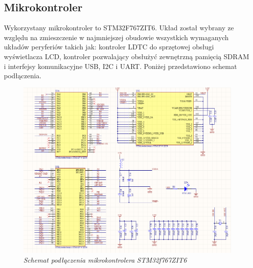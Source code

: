\documentclass[eng,printmode]{mgr}
\begin{document}
\subsection{Mikrokontroler}
Wykorzystany mikrokontroler to STM32F767ZIT6. Układ został wybrany ze względu na zmieszczenie w najmniejszej obudowie wszystkich wymaganych układów peryferiów takich jak: kontroler LDTC do sprzętowej obsługi wyświetlacza LCD, kontroler pozwalający obsłużyć zewnętrzną pamięcią SDRAM i interfejsy komunikacyjne USB, I2C i UART. Poniżej przedstawiono schemat podłączenia.

\begin{figure}[!h]
    \centering
    \includegraphics[height=\textwidth, angle=90]{schematics/uC.png}
    \caption{\textit{\scriptsize Schemat podłączenia mikrokontrolera STM32f767ZIT6}}
\end{figure}
\end{document}
